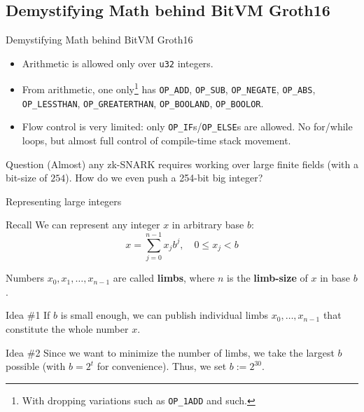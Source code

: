 \documentclass{zkdl-presentation-template}
\newcommand{\cmark}{\textcolor{green!65!black}{\ding{51}}}%
\begin{document}
    \subsection{Demystifying Math behind BitVM Groth16}
    
    \begin{frame}{Demystifying Math behind BitVM Groth16}
        \begin{itemize}[label=\cmark]
            \item Arithmetic is allowed only over \texttt{u32} integers.
            \item From arithmetic, one only\footnote{With dropping variations such as \texttt{OP\_1ADD} and such.} has \texttt{OP\_ADD}, \texttt{OP\_SUB}, \texttt{OP\_NEGATE}, \texttt{OP\_ABS}, \texttt{OP\_LESSTHAN}, \texttt{OP\_GREATERTHAN}, \texttt{OP\_BOOLAND}, \texttt{OP\_BOOLOR}.
            \item Flow control is very limited: only \texttt{OP\_IF}s/\texttt{OP\_ELSE}s are allowed. No for/while loops, but almost full control of compile-time stack movement.
        \end{itemize}

        \begin{alertblock}{Question}
            (Almost) any zk-SNARK requires working over large finite fields (with a bit-size of $254$). How do we even push a 254-bit big integer?
        \end{alertblock}
    \end{frame}

    \begin{frame}{Representing large integers}
        \begin{block}{Recall}
            We can represent any integer $x$ in arbitrary base $b$:
            \begin{equation*}
                x = \sum_{j=0}^{n-1} x_jb^j, \quad 0 \leq x_j < b
            \end{equation*}

            Numbers $x_0,x_1,\dots,x_{n-1}$ are called \textbf{limbs}, where $n$ is the \textbf{limb-size} of $x$ in base $b$.
        \end{block}

        \begin{alertblock}{Idea \#1}
            If $b$ is small enough, we can publish individual limbs $x_0,\dots,x_{n-1}$ that constitute the whole number $x$.
        \end{alertblock}

        \begin{alertblock}{Idea \#2}
            Since we want to minimize the number of limbs, we take the largest $b$ possible (with $b=2^t$ for convenience). Thus, we set $b := 2^{30}$.
        \end{alertblock}
    \end{frame}
\end{document}
